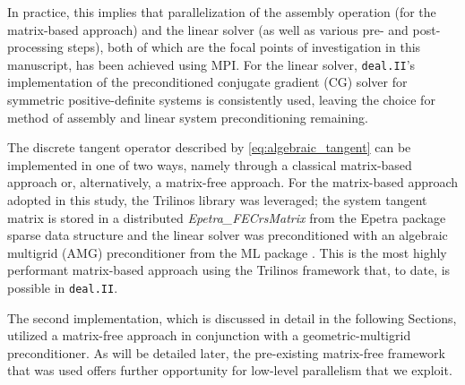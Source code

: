 \documentclass[times,doublespace]{nmeauth}
\newcommand{\changeJP}[1]{#1}
\begin{document}
\changeJP{%
In practice, this implies that parallelization of the assembly operation (for the matrix-based approach) and the linear solver (as well as various pre- and post-processing steps), both of which are the focal points of investigation in this manuscript, has been achieved using MPI.
For the linear solver, \texttt{deal.II}'s implementation of the preconditioned conjugate gradient (CG) solver for symmetric positive-definite systems is consistently used, leaving the choice for method of assembly and linear system preconditioning remaining.
}

\changeJP{%
The discrete tangent operator described by \eqref{eq:algebraic_tangent} can be implemented in one of two ways, namely through a classical matrix-based approach or, alternatively, a matrix-free approach.
For the matrix-based approach adopted in this study, the Trilinos \cite{Heroux2005} library was leveraged;
the system tangent matrix is stored in a distributed \textit{Epetra\_FECrsMatrix} from the Epetra package \cite{Heroux2005b} sparse data structure and the linear solver was preconditioned with an algebraic multigrid (AMG) preconditioner from the ML package \cite{Gee2006a}.
This is the most highly performant matrix-based approach using the Trilinos framework that, to date, is possible in  \texttt{deal.II}.
}

\changeJP{%
The second implementation, which is discussed in detail in the following Sections, utilized a matrix-free approach in conjunction with a geometric-multigrid preconditioner.
As will be detailed later, the pre-existing matrix-free framework that was used offers further opportunity for low-level parallelism that we exploit.
}
\end{document}
